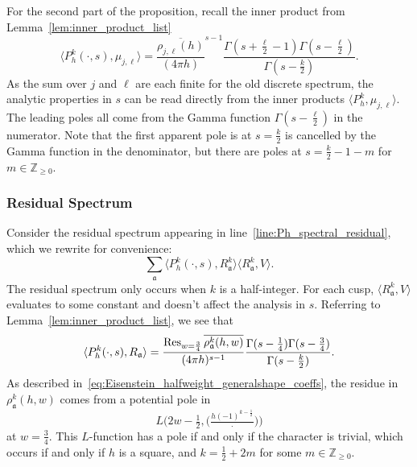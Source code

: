 For the second part of the proposition, recall the inner product from
Lemma~\ref{lem:inner_product_list}
\begin{equation}
  \langle P_h^k(\cdot, s), \mu_{j, \ell} \rangle =
  \frac{\overline{\rho_{j,\ell}(h)}}{(4\pi h)}^{s-1} \frac{\Gamma(s + \frac{\ell}{2} - 1)
  \Gamma(s - \frac{\ell}{2})}{\Gamma(s - \frac{k}{2})}.
\end{equation}
As the sum over $j$ and $\ell$ are each finite for the old discrete spectrum, the analytic
properties in $s$ can be read directly from the inner products $\langle P_h^k, \mu_{j,
\ell} \rangle$.
The leading poles all come from the Gamma function $\Gamma(s - \frac{\ell}{2})$ in the
numerator.
Note that the first apparent pole is at $s = \frac{k}{2}$ is cancelled by the Gamma
function in the denominator, but there are poles at $s = \frac{k}{2} - 1 - m$ for $m \in
\mathbb{Z}_{\geq 0}$.



\subsubsection*{Residual Spectrum}



Consider the residual spectrum appearing in line~\eqref{line:Ph_spectral_residual}, which
we rewrite for convenience:
\begin{equation}
  \sum_{\mathfrak{a}} \langle P_h^k(\cdot, s), R^k_{\mathfrak{a}} \rangle \langle
  R^k_{\mathfrak{a}}, V \rangle.
\end{equation}
The residual spectrum only occurs when $k$ is a half-integer.
For each cusp, $\langle R^k_{\mathfrak{a}}, V \rangle$ evaluates to some constant and
doesn't affect the analysis in $s$.
Referring to Lemma~\ref{lem:inner_product_list}, we see that
\begin{equation}
  \langle P_h^k(\cdot, s), R_{\mathfrak{a}} \rangle = \frac{\operatorname*{Res}_{w = \frac{3}{4}}
  \overline{\rho_\mathfrak{a}^k(h,w)}}{(4\pi h)^{s-1}} \frac{\Gamma(s - \frac{1}{4})
  \Gamma(s - \frac{3}{4})}{\Gamma(s - \frac{k}{2})}.
\end{equation}
As described in~\eqref{eq:Eisenstein_halfweight_generalshape_coeffs}, the residue in
$\rho_\mathfrak{a}^k(h,w)$ comes from a potential pole in
\begin{equation}
  L\Big(2w - \tfrac{1}{2}, \big( \tfrac{h (-1)^{k - \frac{1}{2}}}{\cdot}\big) \Big)
\end{equation}
at $w = \frac{3}{4}$.
This $L$-function has a pole if and only if the character is trivial, which occurs if and
only if $h$ is a square, and $k = \frac{1}{2} + 2m$ for some $m \in \mathbb{Z}_{\geq 0}$.


